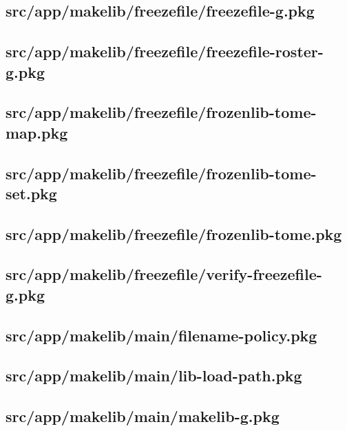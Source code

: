 \subsection{src/app/makelib/freezefile/freezefile-g.pkg}


\subsection{src/app/makelib/freezefile/freezefile-roster-g.pkg}


\subsection{src/app/makelib/freezefile/frozenlib-tome-map.pkg}


\subsection{src/app/makelib/freezefile/frozenlib-tome-set.pkg}


\subsection{src/app/makelib/freezefile/frozenlib-tome.pkg}


\subsection{src/app/makelib/freezefile/verify-freezefile-g.pkg}


\subsection{src/app/makelib/main/filename-policy.pkg}


\subsection{src/app/makelib/main/lib-load-path.pkg}


\subsection{src/app/makelib/main/makelib-g.pkg}


